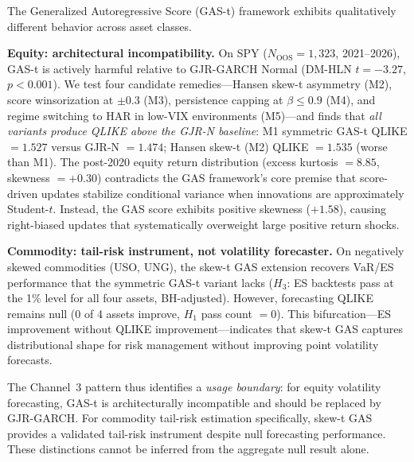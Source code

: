\documentclass[12pt,a4paper]{article}
\begin{document}
The Generalized Autoregressive Score (GAS-t) framework \citep{crealetal2013} exhibits qualitatively different behavior across asset classes.

\textbf{Equity: architectural incompatibility.} On SPY ($N_{\text{OOS}} = 1{,}323$, 2021--2026), GAS-t is actively harmful relative to GJR-GARCH Normal (DM-HLN $t = -3.27$, $p < 0.001$). We test four candidate remedies---Hansen skew-t asymmetry (M2), score winsorization at $\pm0.3$ (M3), persistence capping at $\beta \leq 0.9$ (M4), and regime switching to HAR in low-VIX environments (M5)---and finds that \emph{all variants produce QLIKE above the GJR-N baseline}: M1 symmetric GAS-t QLIKE $= 1.527$ versus GJR-N $= 1.474$; Hansen skew-t (M2) QLIKE $= 1.535$ (worse than M1). The post-2020 equity return distribution (excess kurtosis $= 8.85$, skewness $= +0.30$) contradicts the GAS framework's core premise that score-driven updates stabilize conditional variance when innovations are approximately Student-$t$. Instead, the GAS score exhibits positive skewness ($+1.58$), causing right-biased updates that systematically overweight large positive return shocks.

\textbf{Commodity: tail-risk instrument, not volatility forecaster.} On negatively skewed commodities (USO, UNG), the skew-t GAS extension \citep{hansen1994} recovers VaR/ES performance that the symmetric GAS-t variant lacks ($H_3$: ES backtests pass at the 1\% level for all four assets, BH-adjusted). However, forecasting QLIKE remains null (0 of 4 assets improve, $H_1$ pass count $= 0$). This bifurcation---ES improvement without QLIKE improvement---indicates that skew-t GAS captures distributional shape for risk management without improving point volatility forecasts.

The Channel~3 pattern thus identifies a \emph{usage boundary}: for equity volatility forecasting, GAS-t is architecturally incompatible and should be replaced by GJR-GARCH. For commodity tail-risk estimation specifically, skew-t GAS provides a validated tail-risk instrument despite null forecasting performance. These distinctions cannot be inferred from the aggregate null result alone.
\end{document}
